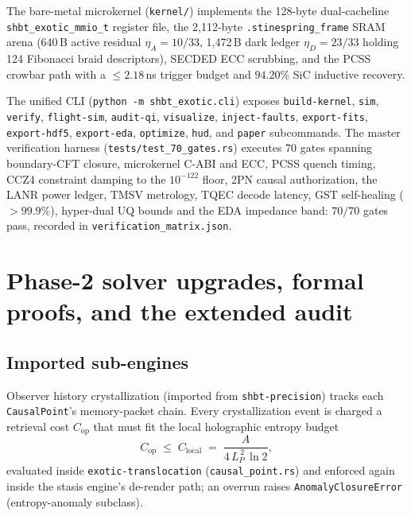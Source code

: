 \documentclass[aps,pra,10pt,onecolumn,superscriptaddress,nofootinbib,longbibliography,floatfix]{revtex4-2}
\newcommand{\ExoticPcssTriggerNs}{2.18}%
\newcommand{\ExoticSicRecovery}{94.20}%
\newcommand{\ExoticBraidDescriptors}{124}%
\newcommand{\ExoticGstHealing}{99.9}%
\newcommand{\ExoticGatePass}{70}%
\newcommand{\ExoticGateTotal}{70}%
\begin{document}
The bare-metal microkernel (\texttt{kernel/}) implements the 128-byte dual-cacheline \texttt{shbt\_exotic\_mmio\_t} register file, the 2{,}112-byte \texttt{.stinespring\_frame} SRAM arena (640\,B active residual $\eta_A=10/33$, 1{,}472\,B dark ledger $\eta_D=23/33$ holding \ExoticBraidDescriptors{} Fibonacci braid descriptors), SECDED ECC scrubbing, and the PCSS crowbar path with a $\le\ExoticPcssTriggerNs$\,ns trigger budget and $\ExoticSicRecovery\%$ SiC inductive recovery.

The unified CLI (\texttt{python -m shbt\_exotic.cli}) exposes \texttt{build-kernel}, \texttt{sim}, \texttt{verify}, \texttt{flight-sim}, \texttt{audit-qi}, \texttt{visualize}, \texttt{inject-faults}, \texttt{export-fits}, \texttt{export-hdf5}, \texttt{export-eda}, \texttt{optimize}, \texttt{hud}, and \texttt{paper} subcommands.  The master verification harness (\texttt{tests/test\_70\_gates.rs}) executes $\ExoticGateTotal$ gates spanning boundary-CFT closure, microkernel C-ABI and ECC, PCSS quench timing, CCZ4 constraint damping to the $10^{-122}$ floor, 2PN causal authorization, the LANR power ledger, TMSV metrology, TQEC decode latency, GST self-healing ($>\ExoticGstHealing\%$), hyper-dual UQ bounds and the EDA impedance band: $\ExoticGatePass/\ExoticGateTotal$ gates pass, recorded in \texttt{verification\_matrix.json}.


\section{Phase-2 solver upgrades, formal proofs, and the extended audit}\label{sec:phase2}

\subsection{Imported sub-engines}

Observer history crystallization (imported from \texttt{shbt-precision}) tracks each
\texttt{CausalPoint}'s memory-packet chain.  Every crystallization event is charged a
retrieval cost $C_{\mathrm{op}}$ that must fit the local holographic entropy budget
\begin{equation}
C_{\mathrm{op}} \;\le\; C_{\mathrm{local}} \;=\; \frac{A}{4\,L_P^{\,2}\,\ln 2},
\end{equation}
evaluated inside \texttt{exotic-translocation} (\texttt{causal\_point.rs}) and enforced
again inside the stasis engine's de-render path; an overrun raises
\texttt{AnomalyClosureError} (entropy-anomaly subclass).
\end{document}
